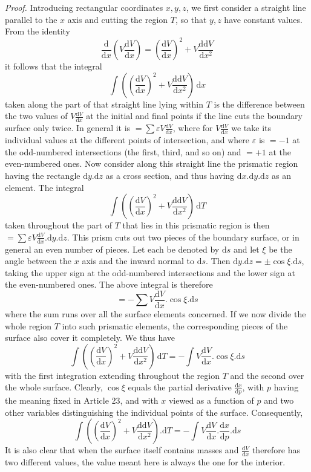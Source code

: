 \textit{Proof.} Introducing rectangular coordinates $x,y,z$, we first consider a straight line parallel to the $x$ axis and cutting the region $T$, so that $y,z$ have constant values. From the identity
\[
\frac{\mathrm d}{\mathrm dx}(V\frac{\mathrm dV}{\mathrm dx})=(\frac{\mathrm dV}{\mathrm dx})^2+V\frac{\mathrm d\mathrm dV}{\mathrm dx^2}
\]
it follows that the integral
\[
\int((\frac{\mathrm dV}{\mathrm dx})^2+V\frac{\mathrm d\mathrm dV}{\mathrm dx^2})\,\mathrm dx
\]
taken along the part of that straight line lying within $T$ is the difference between the two values of $V\frac{\mathrm dV}{\mathrm dx}$ at the initial and final points if the line cuts the boundary surface only twice. In general it is $=\sum\varepsilon V\frac{\mathrm dV}{\mathrm dx}$, where for $V\frac{\mathrm dV}{\mathrm dx}$ we take its individual values at the different points of intersection, and where $\varepsilon$ is $=-1$ at the odd-numbered intersections (the first, third, and so on) and $=+1$ at the even-numbered ones. Now consider along this straight line the prismatic region having the rectangle $\mathrm dy.\mathrm dz$ as a cross section, and thus having $\mathrm dx.\mathrm dy.\mathrm dz$ as an element. The integral
\[
\int((\frac{\mathrm dV}{\mathrm dx})^2+V\frac{\mathrm d\mathrm dV}{\mathrm dx^2})\,\mathrm dT
\]
taken throughout the part of $T$ that lies in this prismatic region is then $=\sum\varepsilon V\frac{\mathrm dV}{\mathrm dx}.\mathrm dy.\mathrm dz$. This prism cuts out two pieces of the boundary surface, or in general an even number of pieces. Let each be denoted by $\mathrm ds$ and let $\xi$ be the angle between the $x$ axis and the inward normal to $\mathrm ds$. Then $\mathrm dy.\mathrm dz=\pm\cos\xi.\mathrm ds$, taking the upper sign at the odd-numbered intersections and the lower sign at the even-numbered ones. The above integral is therefore
\[
=-\sum V\frac{\mathrm dV}{\mathrm dx}.\cos\xi.\mathrm ds
\]
where the sum runs over all the surface elements concerned. If we now divide the whole region $T$ into such prismatic elements, the corresponding pieces of the surface also cover it completely. We thus have
\[
\int((\frac{\mathrm dV}{\mathrm dx})^2+V\frac{\mathrm d\mathrm dV}{\mathrm dx^2})\,\mathrm dT=-\int V\frac{\mathrm dV}{\mathrm dx}.\cos\xi.\mathrm ds
\]
with the first integration extending throughout the region $T$ and the second over the whole surface. Clearly, $\cos\xi$ equals the partial derivative $\frac{\mathrm dx}{\mathrm dp}$, with $p$ having the meaning fixed in Article 23, and with $x$ viewed as a function of $p$ and two other variables distinguishing the individual points of the surface. Consequently,
\[
\int((\frac{\mathrm dV}{\mathrm dx})^2+V\frac{\mathrm d\mathrm dV}{\mathrm dx^2}).\mathrm dT=-\int V\frac{\mathrm dV}{\mathrm dx}.\frac{\mathrm dx}{\mathrm dp}.\mathrm ds
\]
It is also clear that when the surface itself contains masses and $\frac{\mathrm dV}{\mathrm dx}$ therefore has two different values, the value meant here is always the one for the interior.

